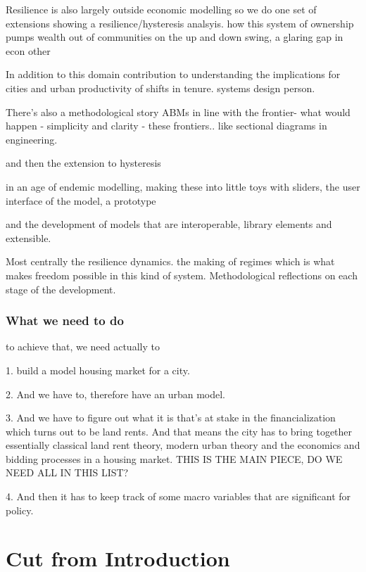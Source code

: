 Resilience is also largely outside economic modelling
so we do one set of extensions showing a resilience/hysteresis analsyis. how this system of ownership pumps wealth out of communities on the up and down swing, a glaring gap in econ other

In addition to this domain contribution to understanding the implications for cities and urban productivity of shifts in tenure. 
systems design person.

There's also a methodological story 
ABMs in line with the frontier- what would happen - simplicity and clarity - these frontiers.. like sectional diagrams in engineering. 

and then the extension to hysteresis

in an age of endemic modelling, making these into little toys with sliders, the user interface of the model, a prototype

and the development of models that are interoperable, library elements and extensible. 


Most centrally the resilience dynamics.
the making of regimes which is what makes freedom possible in this kind of system. 
Methodological reflections on each stage of the development. 




\subsection{What we need to do}
to achieve that, we need actually to 

1. build a model housing market for a city. 

2. And we have to, therefore have an urban model. 

3. And we have to figure out what it is that's at stake in the financialization which turns out to be land rents. And that means the city has to bring together essentially classical land rent theory, modern urban theory and the economics and bidding processes in a housing market. THIS IS THE MAIN PIECE, DO WE  NEED ALL IN THIS LIST?

4. And then it has to keep track of some macro variables that are significant for policy. 


\chapter{Cut from Introduction}


